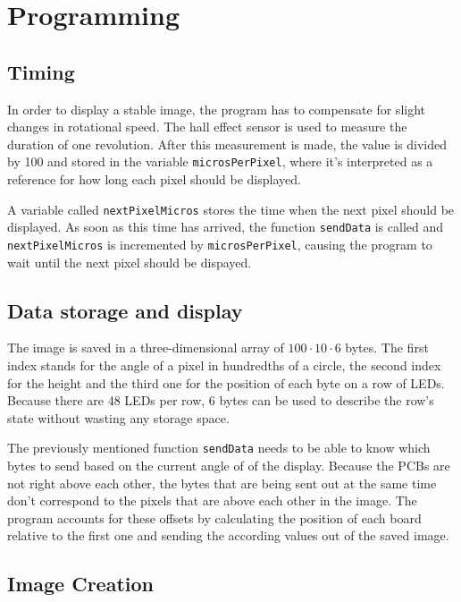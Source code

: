 \documentclass[a4paper, 11pt, titlepage]{article}
\begin{document}
\section{Programming}

\subsection{Timing}

In order to display a stable image, the program has to compensate for slight changes in rotational
speed. The hall effect sensor is used to measure the duration of one revolution. After this
measurement is made, the value is divided by 100 and stored in the variable
\texttt{microsPerPixel}, where it's interpreted as a reference for how long each pixel should be
displayed.

A variable called \texttt{nextPixelMicros} stores the time when the next pixel should be
displayed. As soon as this time has arrived, the function \texttt{sendData} is called and
\texttt{nextPixelMicros} is incremented by \texttt{microsPerPixel}, causing the program to wait
until the next pixel should be dispayed.


\subsection{Data storage and display}

The image is saved in a three-dimensional array of $100 \cdot 10 \cdot 6$ bytes. The first index
stands for the angle of a pixel in hundredths of a circle, the second index for the height and the
third one for the position of each byte on a row of LEDs. Because there are 48 LEDs per row, 6
bytes can be used to describe the row's state without wasting any storage space.

The previously mentioned function \texttt{sendData} needs to be able to know which bytes to send
based on the current angle of of the display. Because the PCBs are not right above each other, the
bytes that are being sent out at the same time don't correspond to the pixels that are above each
other in the image. The program accounts for these offsets by calculating the position of each
board relative to the first one and sending the according values out of the saved image.


\subsection{Image Creation}
\end{document}
